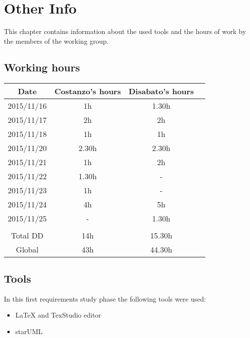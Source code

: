 \documentclass[\mainpath/main]{subfiles}
\begin{document}
\chapter{Other Info}
\label{other_info}

\setmyfancystyle

This chapter contains information about the used tools and the hours of work by the members of the working group.

\section{Working hours}
\begin{table}[h!]
\begin{tabular}{cccc}
\hline
Date & 		 Costanzo's hours & Disabato's hours  & \\ \hline
2015/11/16 & 1h 			  & 1.30h 			  & \\ \hline
2015/11/17 & 2h 			  & 2h 				  & \\ \hline 
2015/11/18 & 1h 			  & 1h 				  & \\ \hline
2015/11/20 & 2.30h 			  & 2.30h 			  & \\ \hline
2015/11/21 & 1h 			  & 2h 				  & \\ \hline
2015/11/22 & 1.30h 			  & - 				  & \\ \hline
2015/11/23 & 1h				  & -                 & \\ \hline
2015/11/24 & 4h				  & 5h				  & \\ \hline
2015/11/25 & -				  & 1.30h				  & \\ \hline
\\
Total DD   & 14h 			  & 15.30h 				  & \\ \hline
Global 	   & 43h 		  	  & 44.30h 			  & \\ \hline

\end{tabular}
\end{table}

\section{Tools}
In this first requirements study phase the following tools were used:
\begin{itemize}
	\item \LaTeX{} and TexStudio editor
	\item starUML
\end{itemize}
\end{document}
